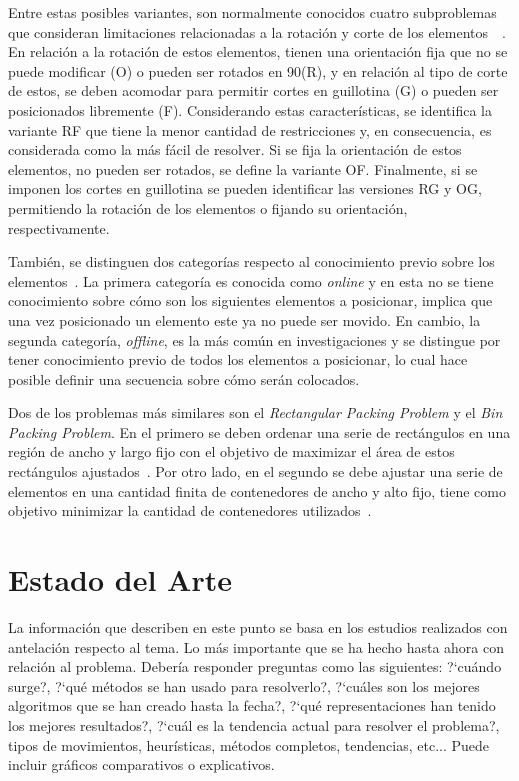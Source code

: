 \documentclass[letter, 10pt]{article}
\begin{document}
Entre estas posibles variantes, son normalmente conocidos cuatro subproblemas que consideran limitaciones relacionadas a la rotaci\'on y corte de los elementos~\cite{junior2022rectangular}~\cite{lodi2002two}. En relaci\'on a la rotaci\'on de estos elementos, tienen una orientaci\'on fija que no se puede modificar (O) o pueden ser rotados en 90\textdegree (R), y en relaci\'on al tipo de corte de estos, se deben acomodar para permitir cortes en guillotina (G) o pueden ser posicionados libremente (F). Considerando estas caracter\'isticas, se identifica la variante RF que tiene la menor cantidad de restricciones y, en consecuencia, es considerada como la m\'as f\'acil de resolver. Si se fija la orientaci\'on de estos elementos, no pueden ser rotados, se define la variante OF. Finalmente, si se imponen los cortes en guillotina se pueden identificar las versiones RG y OG, permitiendo la rotaci\'on de los elementos o fijando su orientaci\'on, respectivamente.

Tambi\'en, se distinguen dos categor\'ias respecto al conocimiento previo sobre los elementos~\cite{oliveira2016survey}. La primera categor\'ia es conocida como \emph{online} y en esta no se tiene conocimiento sobre c\'omo son los siguientes elementos a posicionar, implica que una vez posicionado un elemento este ya no puede ser movido. En cambio, la segunda categor\'ia, \emph{offline}, es la m\'as com\'un en investigaciones y se distingue por tener conocimiento previo de todos los elementos a posicionar, lo cual hace posible definir una secuencia sobre c\'omo ser\'an colocados.

Dos de los problemas m\'as similares son el \emph{Rectangular Packing Problem} y el \emph{Bin Packing Problem}. En el primero se deben ordenar una serie de rect\'angulos en una regi\'on de ancho y largo fijo con el objetivo de maximizar el \'area de estos rect\'angulos ajustados~\cite{chen2007two}. Por otro lado, en el segundo se debe ajustar una serie de elementos en una cantidad finita de contenedores de ancho y alto fijo, tiene como objetivo minimizar la cantidad de contenedores utilizados~\cite{lodi2002two}.

\section{Estado del Arte}

La informaci\'on que describen en este punto se basa en los estudios realizados con antelaci\'on respecto al tema. Lo m\'as importante que se ha hecho hasta ahora con relaci\'on al problema. Deber\'ia responder preguntas como las siguientes: ?`cu\'ando surge?, ?`qu\'e m\'etodos se han usado para resolverlo?, ?`cu\'ales son los mejores algoritmos que se han creado hasta la fecha?, ?`qu\'e representaciones han tenido los mejores resultados?, ?`cu\'al es la tendencia actual para resolver el problema?, tipos de movimientos, heur\'isticas, m\'etodos completos, tendencias, etc... Puede incluir gr\'aficos comparativos o explicativos.
\vspace{0.2cm}
\end{document}
